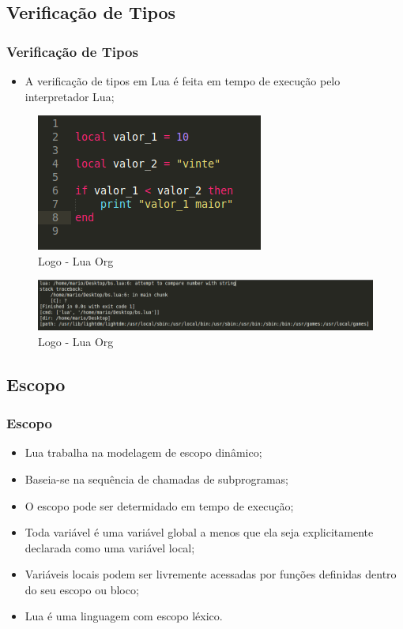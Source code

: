 \documentclass{beamer}
\begin{document}
\subsection{Verificação de Tipos}
\begin{frame}[fragile]
\frametitle{Verificação de Tipos}
	\begin{itemize}
	\item A verificação de tipos em Lua é feita em tempo de execução pelo interpretador Lua;
	\end{itemize}
	\begin{figure}[!htb]
			\centering
			\includegraphics[width=0.3\linewidth]{imagens/verificacao_tipo2}
			\caption{Logo - Lua Org}
	\end{figure}

	\begin{figure}[!htb]
			\centering
			\includegraphics[width=1\linewidth]{imagens/verificacao_tipo}
			\caption{Logo - Lua Org}
	\end{figure}
\end{frame}

\subsection{Escopo}
\begin{frame}[fragile]
\frametitle{Escopo}
	\begin{itemize}
	\item<1-> Lua trabalha na modelagem de escopo dinâmico; 
	\item<2-> Baseia-se na sequência de chamadas de subprogramas;
	\item<3-> O escopo pode ser determidado em tempo de execução;
	\item<4-> Toda variável é uma variável global a menos que ela seja explicitamente declarada como uma variável local;
	\item<5-> Variáveis locais podem ser livremente acessadas por funções definidas dentro do seu escopo ou bloco;
	\item<6-> Lua é uma linguagem com escopo léxico.
	\end{itemize}
\end{frame}
\end{document}
